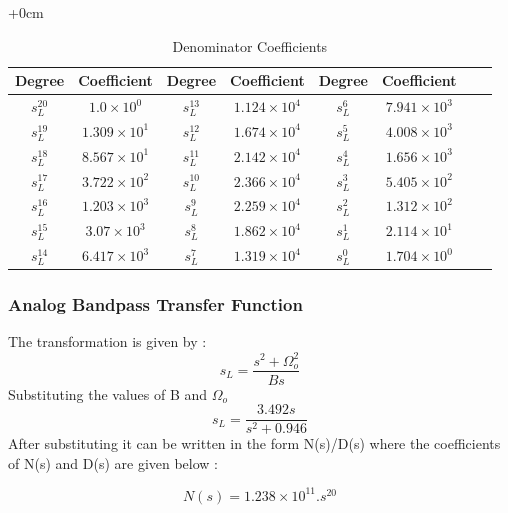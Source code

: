 \documentclass{article}
\begin{document}
\begin{table}[H]
  \centering
		\begin{adjustwidth}{+0cm}{}
		\caption{Denominator Coefficients}
		\begin{tabular}{|c|c|c|c|c|c|c|c|}
\hline
Degree & Coefficient & Degree & Coefficient & Degree & Coefficient\\
\hline
$s_L^{ 20 }$ & $ 1.0 \times 10^{ 0 }$ & $s_L^{ 13 }$ & $ 1.124 \times 10^{ 4 }$ & $s_L^{ 6 }$ & $ 7.941 \times 10^{ 3 }$  \\
\hline
$s_L^{ 19 }$ & $ 1.309 \times 10^{ 1 }$ & $s_L^{ 12 }$ & $ 1.674 \times 10^{ 4 }$ & $s_L^{ 5 }$ & $ 4.008 \times 10^{ 3 }$  \\
\hline
$s_L^{ 18 }$ & $ 8.567 \times 10^{ 1 }$ & $s_L^{ 11 }$ & $ 2.142 \times 10^{ 4 }$ & $s_L^{ 4 }$ & $ 1.656 \times 10^{ 3 }$  \\
\hline
$s_L^{ 17 }$ & $ 3.722 \times 10^{ 2 }$ & $s_L^{ 10 }$ & $ 2.366 \times 10^{ 4 }$ & $s_L^{ 3 }$ & $ 5.405 \times 10^{ 2 }$  \\
\hline
$s_L^{ 16 }$ & $ 1.203 \times 10^{ 3 }$ & $s_L^{ 9 }$ & $ 2.259 \times 10^{ 4 }$ & $s_L^{ 2 }$ & $ 1.312 \times 10^{ 2 }$  \\
\hline
$s_L^{ 15 }$ & $ 3.07 \times 10^{ 3 }$ & $s_L^{ 8 }$ & $ 1.862 \times 10^{ 4 }$ & $s_L^{ 1 }$ & $ 2.114 \times 10^{ 1 }$  \\
\hline
$s_L^{ 14 }$ & $ 6.417 \times 10^{ 3 }$ & $s_L^{ 7 }$ & $ 1.319 \times 10^{ 4 }$ & $s_L^{ 0 }$ & $ 1.704 \times 10^{ 0 }$  \\
\hline
  	\end{tabular}
	\end{adjustwidth}
\end{table}
\subsubsection{Analog Bandpass Transfer Function}
The transformation is given by :
\begin{equation*}
    s_L = \frac{s^2 + \Omega_o^2 }{Bs}
\end{equation*}
Substituting the values of B and $\Omega_o$
\begin{equation*}
    s_L = \frac{3.492s}{s^2 + 0.946}
\end{equation*}
After substituting it can be written in the form N(s)/D(s) where the coefficients of N(s) and D(s) are given below :

\begin{equation*}
    N(s) = 1.238 \times 10^{11}. s^{20} 
\end{equation*}
\end{document}

